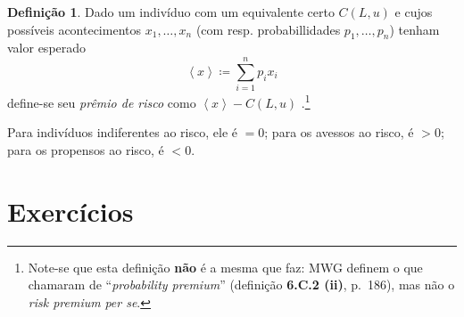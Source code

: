 \documentclass[12pt]{article}
\numberwithin{equation}{section}
\theoremstyle{plain}
\theoremstyle{definition}
\newtheorem{definition}[theorem]{Definição}
\theoremstyle{remark}
\begin{document}
\begin{definition}
Dado um indivíduo com um equivalente certo \(C(L, u)\) e cujos possíveis
acontecimentos \(x_{1},\dots,x_{n}\) (com resp. probabillidades
\(p_{1},\dots,p_{n}\)) tenham valor esperado
\[
\left<x\right> \coloneqq \sum \limits_{i=1}^{n} p_{i} x_{i}
\]
define-se seu \textit{prêmio de risco} como
\(\left< x \right> - C(L,u)\)
\parencite[, p. 191]{Cowell2004}.\footnote{Note-se que esta definição
  \textbf{não} é a mesma que \textcite{Mas-Colell1995} faz: MWG definem
  o que chamaram de ``\textit{probability premium}'' (definição
  \textbf{6.C.2 (ii)}, p.~186), mas não o \textit{risk premium}
  \textit{per se}.}

Para indivíduos indiferentes ao risco, ele é \(= 0\); para os avessos ao
risco, é \(>0\); para os propensos ao risco, é \(<0\).
\end{definition}

\hypertarget{exercuxedcios}{%
\section{Exercícios}\label{exercuxedcios}}
\end{document}
